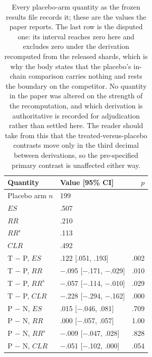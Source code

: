 \documentclass[letterpaper]{article}
\begin{document}
\begin{table}[t]
\centering
\small
\begin{tabular}{@{}llr@{}}
\toprule
Quantity & Value [95\% CI] & \(p\) \\
\midrule
Placebo arm \(n\)      & 199 & \\
\addlinespace
\(ES\)                 & .507 & \\
\(RR\)                 & .210 & \\
\(RR^s\)               & .113 & \\
\(CLR\)                & .492 & \\
\addlinespace
T \(-\) P, \(ES\)      & .122 [.051, .193]        & .002 \\
T \(-\) P, \(RR\)      & $-$.095 [$-$.171, $-$.029] & .010 \\
T \(-\) P, \(RR^s\)    & $-$.057 [$-$.114, $-$.010] & .029 \\
T \(-\) P, \(CLR\)     & $-$.228 [$-$.294, $-$.162] & .000 \\
\addlinespace
P \(-\) N, \(ES\)      & .015 [$-$.046, .081]     & .709 \\
P \(-\) N, \(RR\)      & .000 [$-$.057, .057]     & 1.00 \\
P \(-\) N, \(RR^s\)    & $-$.009 [$-$.047, .028]  & .828 \\
P \(-\) N, \(CLR\)     & $-$.051 [$-$.102, .000]  & .054 \\
\bottomrule
\end{tabular}
\caption{Every placebo-arm quantity as the frozen results file records it; these
are the values the paper reports.  The last row is the disputed one: its
interval reaches zero here and excludes zero under the derivation recomputed
from the released shards, which is why the body states that the placebo's
in-chain comparison carries nothing and rests the boundary on the competitor.
No quantity in the paper was altered on the strength of the recomputation, and
which derivation is authoritative is recorded for adjudication rather than
settled here.  The reader should take from this that the treated-versus-placebo
contrasts move only in the third decimal between derivations, so the
pre-specified primary contrast is unaffected either way.}
\label{tab:s10-placebo}
\end{table}
\end{document}
